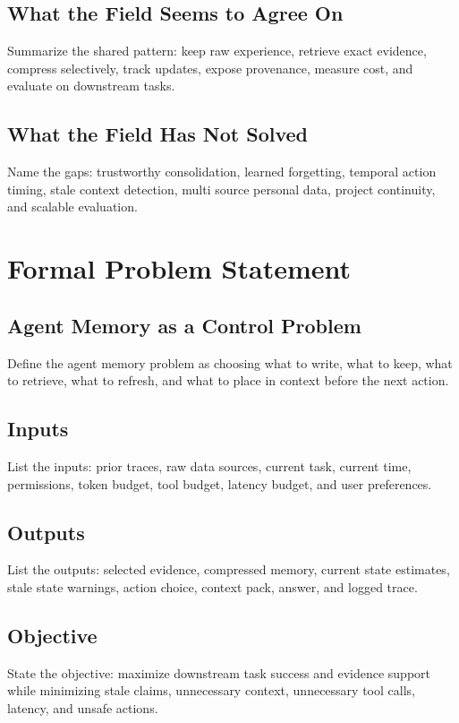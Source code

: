 \documentclass[11pt]{article}
\begin{document}
\subsection{What the Field Seems to Agree On}
Summarize the shared pattern: keep raw experience, retrieve exact evidence, compress selectively, track updates, expose provenance, measure cost, and evaluate on downstream tasks.

\subsection{What the Field Has Not Solved}
Name the gaps: trustworthy consolidation, learned forgetting, temporal action timing, stale context detection, multi source personal data, project continuity, and scalable evaluation.

\section{Formal Problem Statement}

\subsection{Agent Memory as a Control Problem}
Define the agent memory problem as choosing what to write, what to keep, what to retrieve, what to refresh, and what to place in context before the next action.

\subsection{Inputs}
List the inputs: prior traces, raw data sources, current task, current time, permissions, token budget, tool budget, latency budget, and user preferences.

\subsection{Outputs}
List the outputs: selected evidence, compressed memory, current state estimates, stale state warnings, action choice, context pack, answer, and logged trace.

\subsection{Objective}
State the objective: maximize downstream task success and evidence support while minimizing stale claims, unnecessary context, unnecessary tool calls, latency, and unsafe actions.
\end{document}
